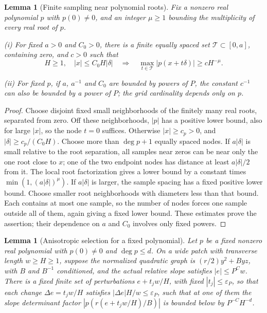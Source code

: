 \documentclass[11pt]{amsart}
\newtheorem{lemma}[theorem]{Lemma}
\theoremstyle{definition}
\theoremstyle{remark}
\numberwithin{equation}{section}
\begin{document}
\begin{lemma}[Finite sampling near polynomial roots]\label{atlas:finite-slope-grid}
Fix a nonzero real polynomial $p$ with $p(0)\ne0$, and an integer $\mu\ge1$ bounding the multiplicity of every real root of $p$.

\noindent\textup{(i)} For fixed $a>0$ and $C_0>0$, there is a finite equally spaced set $\mathcal T\subset[0,a]$, containing zero, and $c>0$ such that
\[
H\ge1,\quad |x|\le C_0H|\delta|\quad\Longrightarrow\quad \max_{t\in\mathcal T}|p(x+t\delta)|\ge cH^{-\mu}.
\]

\noindent\textup{(ii)} For fixed $p$, if $a$, $a^{-1}$ and $C_0$ are bounded by powers of $P$, the constant $c^{-1}$ can also be bounded by a power of $P$; the grid cardinality depends only on $p$.
\end{lemma}
\begin{proof}
Choose disjoint fixed small neighborhoods of the finitely many real roots, separated from zero. Off these neighborhoods, $|p|$ has a positive lower bound, also for large $|x|$, so the node $t=0$ suffices. Otherwise $|x|\ge c_p>0$, and $|\delta|\ge c_p/(C_0H)$. Choose more than $\deg p+1$ equally spaced nodes. If $a|\delta|$ is small relative to the root separation, all samples near zeros can be near only the one root close to $x$; one of the two endpoint nodes has distance at least $a|\delta|/2$ from it. The local root factorization gives a lower bound by a constant times $\min(1,(a|\delta|)^\mu)$. If $a|\delta|$ is larger, the sample spacing has a fixed positive lower bound. Choose smaller root neighborhoods with diameters less than that bound. Each contains at most one sample, so the number of nodes forces one sample outside all of them, again giving a fixed lower bound. These estimates prove the assertion; their dependence on $a$ and $C_0$ involves only fixed powers.
\end{proof}

\begin{lemma}[Anisotropic selection for a fixed polynomial]\label{surf:slope-selection}
Let $p$ be a fixed nonzero real polynomial with $p(0)\ne0$ and $\deg p\le d$. On a wide patch with transverse length $w\ge H\ge1$, suppose the normalized quadratic graph is $(r/2)y^2+Byz$, with $B$ and $B^{-1}$ conditioned, and the actual relative slope satisfies $|e|\le P^Cw$. There is a fixed finite set of perturbations $e+t_jw/H$, with fixed $|t_j|\le\varepsilon_P$, so that each change $\Delta e=t_jw/H$ satisfies $|\Delta e|H/w\le\varepsilon_P$, such that at one of them the slope determinant factor $|p(r(e+t_jw/H)/B)|$ is bounded below by $P^{-C}H^{-d}$.
\end{lemma}
\end{document}
